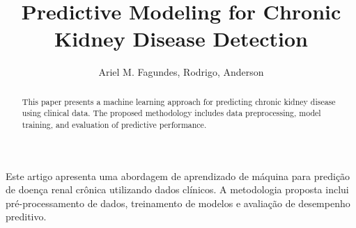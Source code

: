 \documentclass[12pt]{article}
\title{Predictive Modeling for Chronic Kidney Disease Detection}
\author{Ariel M. Fagundes\inst{1}, Rodrigo\inst{1}, Anderson\inst{1} }
\begin{document}
 

\maketitle

\begin{abstract}
This paper presents a machine learning approach for predicting chronic kidney
disease using clinical data. The proposed methodology includes data 
preprocessing, model training, and evaluation of predictive performance.
\end{abstract}
     
\begin{resumo}
Este artigo apresenta uma abordagem de aprendizado de máquina para predição 
de doença renal crônica utilizando dados clínicos. A metodologia proposta 
inclui pré-processamento de dados, treinamento de modelos e avaliação de
desempenho preditivo.
\end{resumo}













\end{document}
